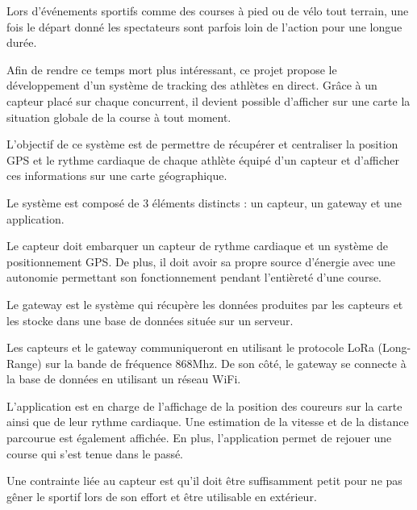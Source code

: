 
Lors d’événements sportifs comme des courses à pied ou de vélo tout terrain, une fois le départ donné les spectateurs sont parfois loin de l’action pour une longue durée.

Afin de rendre ce temps mort plus intéressant, ce projet propose le développement d’un système de tracking des athlètes en direct. Grâce à un capteur placé sur chaque concurrent, il devient possible d’afficher sur une carte la situation globale de la course à tout moment.

L’objectif de ce système est de permettre de récupérer et centraliser la position GPS et le rythme cardiaque de chaque athlète équipé d’un capteur et d’afficher ces informations sur une carte géographique.

Le système est composé de 3 éléments distincts : un capteur, un gateway et une application.

Le capteur doit embarquer un capteur de rythme cardiaque et un système de positionnement GPS. De plus, il doit avoir sa propre source d’énergie avec une autonomie permettant son fonctionnement pendant l’entièreté d’une course.

Le gateway est le système qui récupère les données produites par les capteurs et les stocke dans une base de données située sur un serveur.

Les capteurs et le gateway communiqueront en utilisant le protocole LoRa (Long-Range) sur la bande de fréquence 868Mhz. De son côté, le gateway se connecte à la base de données en utilisant un réseau WiFi.

L’application est en charge de l’affichage de la position des coureurs sur la carte ainsi que de leur rythme cardiaque. Une estimation de la vitesse et de la distance parcourue est également affichée. En plus, l’application permet de rejouer une course qui s’est tenue dans le passé.

Une contrainte liée au capteur est qu’il doit être suffisamment petit pour ne pas gêner le sportif lors de son effort et être utilisable en extérieur.
